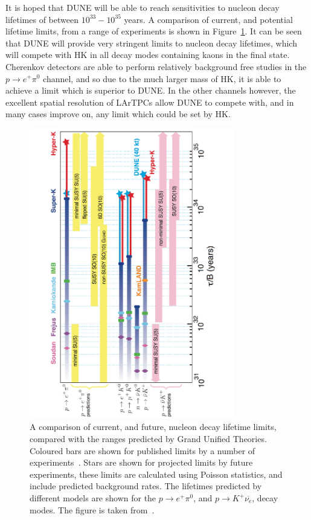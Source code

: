 It is hoped that DUNE will be able to reach sensitivities to nucleon decay lifetimes of between $10^{33}-10^{35}$ years. A comparison of current, and potential lifetime limits, from a range of experiments is shown in Figure~\ref{fig:DUNE_NDK_Lifetime}. It can be seen that DUNE will provide very stringent limits to nucleon decay lifetimes, which will compete with HK in all decay modes containing kaons in the final state. Cherenkov detectors are able to perform relatively background free studies in the $p \rightarrow e^{+} \pi^{0}$ channel, and so due to the much larger mass of HK, it is able to achieve a limit which is superior to DUNE. In the other channels however, the excellent spatial resolution of LArTPCs allow DUNE to compete with, and in many cases improve on, any limit which could be set by HK. \\

\begin{figure}
  \centering
  \includegraphics[width=0.8\textwidth]{NucleonDecayLimits}
  \caption[A comparison of current, and future, nucleon decay lifetime limits, compared with the ranges predicted by Grand Unified Theories.]
          {A comparison of current, and future, nucleon decay lifetime limits, compared with the ranges predicted by Grand Unified Theories. Coloured bars are shown for published limits by a number of experiments~\citep{PDG2012, Nishino:2012bnw}. Stars are shown for projected limits by future experiments, these limits are calculated using Poisson statistics, and include predicted background rates. The lifetimes predicted by different models are shown for the $p \rightarrow e^{+} \pi^{0}$, and $p \rightarrow K^{+} \overline{\nu_{e}}$, decay modes. The figure is taken from~\citep{DUNECDR_V2}.}
  \label{fig:DUNE_NDK_Lifetime}
\end{figure}

